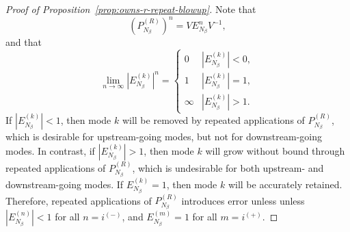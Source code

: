 \begin{proof}[Proof of Proposition~\ref{prop:owns-r-repeat-blowup}]
    Note that
    \[
    (P_{N_\beta}^{(R)})^n = V E_{N_\beta}^n V^{-1},
    \]
    and that
    \[
    \lim_{n\to\infty} |E_{N_\beta}^{(k)}|^n=
    \begin{cases}
        0 & |E_{N_\beta}^{(k)}| < 0,\\
        1 & |E_{N_\beta}^{(k)}| = 1,\\
        \infty & |E_{N_\beta}^{(k)}| > 1.
    \end{cases}
    \]    
    If $|E_{N_\beta}^{(k)}| < 1$, then mode $k$ will be removed by repeated applications of $P_{N_\beta}^{(R)}$, which is desirable for upstream-going modes, but not for downstream-going modes. In contrast, if $|E_{N_\beta}^{(k)}| > 1$, then mode $k$ will grow without bound through repeated applications of $P_{N_\beta}^{(R)}$, which is undesirable for both upstream- and downstream-going modes. If $E_{N_\beta}^{(k)}=1$, then mode $k$ will be accurately retained. Therefore, repeated applications of $P_{N_\beta}^{(R)}$ introduces error unless unless $|E_{N_\beta}^{(n)}|<1$ for all $n=i^{(-)}$, and $E_{N_\beta}^{(m)}=1$ for all $m=i^{(+)}$.
\end{proof}


